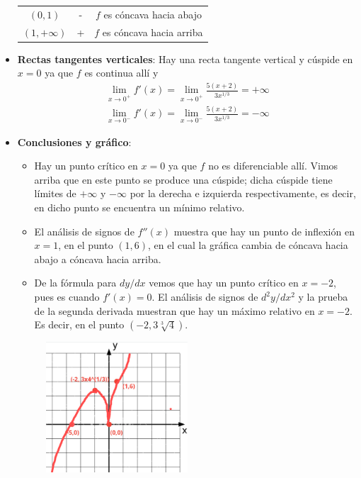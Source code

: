 \documentclass[12pt]{article}
\begin{document}
\begin{itemize}
\begin{table}[H]
\begin{tabular}{c|c|c}
      $(0,1)$ & - & $f$ es cóncava hacia abajo \\
      $(1,+\infty)$ & + & $f$ es cóncava hacia arriba \\
      \hline
    \end{tabular}
  \end{table}
\item \textbf{Rectas tangentes verticales}: Hay una recta tangente vertical y cúspide en $x = 0$ ya que $f$ es continua allí y
  \begin{align*}
    \lim_{x \to 0^+} f'(x) = \lim_{x \to 0^+} \frac{5(x+2)}{3x^{1/3}}  = +\infty \\
    \lim_{x \to 0^-} f'(x) = \lim_{x \to 0^-} \frac{5(x+2)}{3x^{1/3}}  = -\infty 
  \end{align*}
\item \textbf{Conclusiones y gráfico}:
  \begin{itemize}
  \item Hay un punto crítico en $x = 0$ ya que $f$ no es diferenciable allí. Vimos arriba que en este punto se produce una cúspide; dicha cúspide tiene límites de $+\infty$ y $-\infty$ por la derecha e izquierda respectivamente, es decir, en dicho punto se encuentra un mínimo relativo.
  \item El análisis de signos de $f''(x)$ muestra que hay un punto de inflexión en $x = 1$, en el punto $(1,6)$, en el cual la gráfica cambia de cóncava hacia abajo a cóncava hacia arriba.
  \item De la fórmula para $dy /dx$ vemos que hay un punto crítico en $x =-2$, pues es cuando $f'(x)=0$. El análisis de signos de $d^2y/dx^2$ y la prueba de la segunda derivada muestran que hay un máximo relativo en $x=-2$. Es decir, en el punto $(-2,3\sqrt[3]{4})$.
  \end{itemize}
\begin{figure}[H]
\centering
\includegraphics[width=0.5\textwidth]{../img/img_Lista3/p2_36.png}
\end{figure}
\end{itemize}
\end{document}
